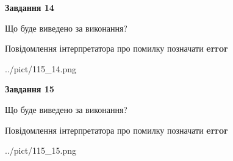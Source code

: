 \documentclass[11pt, ukrainian]{article}
\begin{document}
{\begin {large}
{\begin {center}\textbf{Завдання 14}\end {center}}\par
Що буде виведено за виконання? \par
Повідомлення інтерпретатора про помилку позначати \textbf{error}

\begin{center}
	{../pict/115_14.png}
\end{center}
\newpage

{\begin {center}\textbf{Завдання 15}\end {center}}\par
Що буде виведено за виконання? \par
Повідомлення інтерпретатора про помилку позначати \textbf{error}

\begin{center}
	{../pict/115_15.png}
\end{center}
\newpage

\end {large}}
\end{document}
